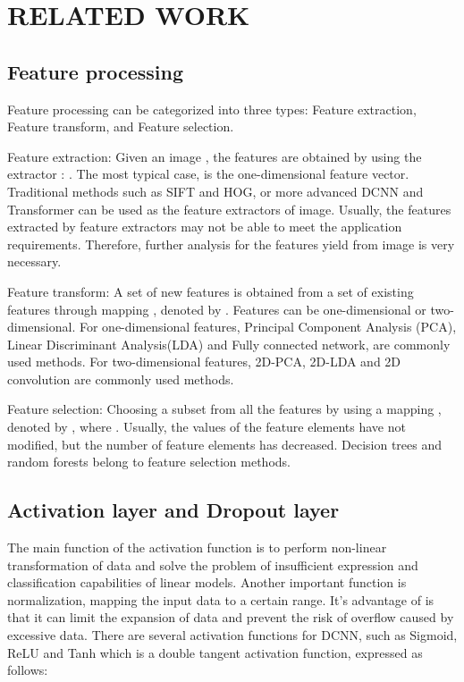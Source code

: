 \documentclass[10pt,twocolumn,letterpaper]{article}
\begin{document}
\section{RELATED WORK}
\subsection{Feature processing}
Feature processing can be categorized into three types: Feature extraction, Feature transform, and Feature selection.

Feature extraction: Given an image , the features  are obtained by using the extractor : . The most typical case,  is the one-dimensional feature vector. Traditional methods such as SIFT\cite{2020Integrating} and HOG\cite{2013BFO}, or more advanced DCNN and Transformer can be used as the feature extractors of image. Usually, the features extracted by feature extractors may not be able to meet the application requirements. Therefore, further analysis for the features yield from image is very necessary.	

Feature transform: A set of new features  is obtained from a set of existing features  through mapping , denoted by . Features can be one-dimensional or two-dimensional. For one-dimensional features, Principal Component Analysis (PCA)\cite{Jian2002From}, Linear Discriminant Analysis(LDA)\cite{2005Boosting} and Fully connected network\cite{2018Fully}, are commonly used methods. For two-dimensional features, 2D-PCA\cite{Li2010L1}, 2D-LDA\cite{20052D} and 2D convolution\cite{SurfConv} are commonly used methods.

Feature selection: Choosing a subset from all the features by using a mapping , denoted by , where . Usually, the values of the feature elements have not modified, but the number of feature elements has decreased. Decision trees\cite{2015Learning} and random forests\cite{Marko2016Incremental} belong to feature selection methods.	
\subsection{Activation layer and Dropout layer}	
The main function of the activation function is to perform non-linear transformation of data and solve the problem of insufficient expression and classification capabilities of linear models. Another important function is normalization, mapping the input data to a certain range. It’s advantage of is that it can limit the expansion of data and prevent the risk of overflow caused by excessive data. There are several activation functions for DCNN, such as Sigmoid, ReLU and Tanh which is a double tangent activation function, expressed as follows:
					
\end{document}
